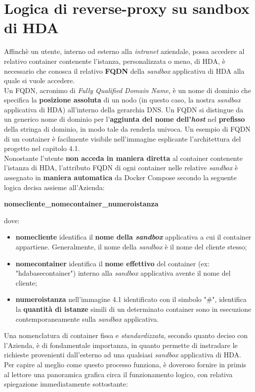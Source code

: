 \section{Logica di reverse-proxy su sandbox di HDA}
Affinchè un utente, interno od esterno alla \textit{intranet} aziendale, possa accedere al relativo container contenente l'istanza, personalizzata o meno, di HDA, è necessario che conosca il relativo \textbf{FQDN} della \textit{sandbox} applicativa di HDA alla quale si vuole accedere.\\
Un FQDN, acronimo di \textit{Fully Qualified Domain Name}, è un nome di dominio che specifica la \textbf{posizione assoluta} di un nodo (in questo caso, la nostra \textit{sandbox} applicativa di HDA) all'interno della gerarchia DNS. Un FQDN si distingue da un generico nome di dominio per l'\textbf{aggiunta del nome dell'\textit{host}} nel \textbf{prefisso} della stringa di dominio, in modo tale da renderla univoca. Un esempio di FQDN di un container è facilmente visibile nell'immagine esplicante l'architettura del progetto nel capitolo 4.1.\\
Nonostante l'utente \textbf{non acceda in maniera diretta} al container contenente l'istanza di HDA, l'attributo FQDN di ogni container nelle relative \textit{sandbox} è assegnato in \textbf{maniera automatica} da Docker Compose secondo la seguente logica decisa assieme all'Azienda:
\centerline{\textbf{nomecliente\_nomecontainer\_numeroistanza}}
dove:
\begin{itemize}
	\item \textbf{nomecliente} identifica il \textbf{nome della \textit{sandbox}} applicativa a cui il container appartiene. Generalmente, il nome della \textit{sandbox} è il nome del cliente stesso;
	\item \textbf{nomecontainer} identifica il \textbf{nome effettivo} del container (ex: "hdabasecontainer") interno alla \textit{sandbox} applicativa avente il nome del cliente;
	\item \textbf{numeroistanza} nell'immagine 4.1 identificato con il simbolo "\#", identifica la \textbf{quantità di istanze} simili di un determinato container sono in esecuzione contemporaneamente sulla \textit{sandbox} applicativa.
\end{itemize}
Una nomenclatura di container fissa e \textit{standardizzata}, secondo quanto deciso con l'Azienda, è di fondamentale importanza, in quanto permette di instradare le richieste provenienti dall'esterno ad una qualsiasi \textit{sandbox} applicativa di HDA.
Per capire al meglio come questo processo funziona, è doveroso fornire in primis al lettore una panoramica grafica circa il funzionamento logico, con relativa spiegazione immediatamente sottostante:
